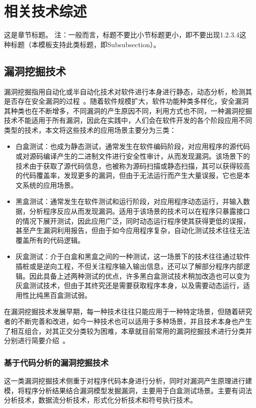 \chapter{相关技术综述}
这是章节标题。
注：一般而言，标题不要比小节标题更小，即不要出现1.2.3.4这种标题（本模板支持此类标题，即Subsubsection）。

\section{漏洞挖掘技术}
漏洞挖掘指用自动化或半自动化技术对软件进行本身进行静态，动态分析，检测其是否存在安全漏洞的过程~\cite{liujian2018}。随着软件规模扩大，软件功能种类多样化，安全漏洞其种类也在不断增多，不同漏洞的产生原因不同，利用方式也不同，一种漏洞挖掘技术不能适用于所有漏洞，因此在实践中，人们会在软件开发的各个阶段应用不同类型的技术，本文将这些技术的应用场景主要分为三类：
\begin{itemize}
    \item  白盒测试：也成为静态测试，通常发生在软件编码阶段，对应用程序的源代码或对源码编译产生的二进制文件进行安全性审计，从而发现漏洞。该场景下的技术由于获取了源代码信息，也被称为源码扫描或静态扫描，其可以获得较高的代码覆盖率，发现更多的漏洞，但由于无法运行而产生大量误报，它也是本文系统的应用场景。
    \item 黑盒测试：通常发生在软件测试和运行阶段，对应用程序动态运行，并输入数据，分析程序反应从而发现漏洞。适用于该场景的技术可以在程序只暴露接口的情况下展开测试，因此应用广泛，同时动态运行程序使其获得更低的误报，甚至产生漏洞利用报告，但由于如今应用程序复杂，自动化测试技术往往无法覆盖所有的代码逻辑。
    \item 灰盒测试：介于白盒和黑盒之间的一种测试，这一场景下的技术往往通过软件插桩或是逆向工程，不但关注程序输入输出信息，还可以了解部分程序内部逻辑。因此具备上述两种测试的优点，许多黑白盒测试技术稍加改造也可以变为灰盒测试技术，但由于其终究还是需要获取程序本身，以及需要动态运行，适用性比纯黑百盒测试弱。
\end{itemize}

在漏洞挖掘技术发展早期，每一种技术往往只能应用于一种特定场景，但随着研究者的不断完善和改进，如今一种技术也可以适用于多种场景，并且技术本身也产生了相互组合，对其正交分类较为困难，本章就目前常用的漏洞挖掘技术进行分类并分别进行简要介绍~\cite{liujian2018,meihong2009}。


\subsection{基于代码分析的漏洞挖掘技术}
这一类漏洞挖掘技术侧重于对程序代码本身进行分析，同时对漏洞产生原理进行建模，将程序分析结果结合漏洞模型发掘漏洞，主要用于白盒测试场景。主要有词法分析技术，数据流分析技术，形式化分析技术和符号执行技术。\\
\vspace{1cm}
